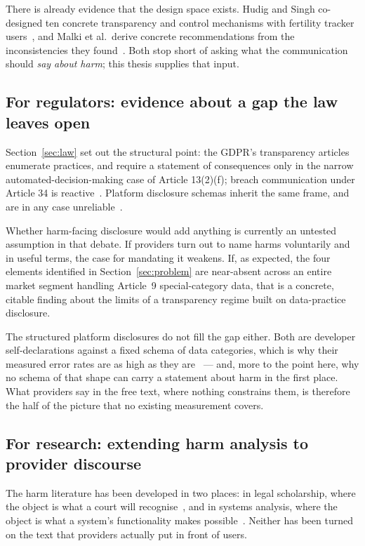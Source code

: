 There is already evidence that the design space exists. Hudig and Singh
co-designed ten concrete transparency and control mechanisms with fertility
tracker users~\parencite{hudig2025intimate}, and Malki et al.\ derive concrete
recommendations from the inconsistencies they
found~\parencite{malki2024exploring}. Both stop short of asking what the
communication should \emph{say about harm}; this thesis supplies that input.

\subsection{For regulators: evidence about a gap the law leaves open}

Section~\ref{sec:law} set out the structural point: the GDPR's
transparency articles enumerate practices, and require a statement of
consequences only in the narrow automated-decision-making case of Article
13(2)(f); breach communication under Article 34 is
reactive~\parencite{gdpr2016}. Platform disclosure schemas inherit the same
frame, and are in any case unreliable~\parencite{arkalakis2024abandon,li2022ios}.

Whether harm-facing disclosure would add anything is currently an untested
assumption in that debate. If providers turn out to name harms voluntarily and
in useful terms, the case for mandating it weakens. If, as expected, the four
elements identified in Section~\ref{sec:problem} are near-absent across an
entire market segment handling Article~9 special-category data, that is a
concrete, citable finding about the limits of a transparency regime built on
data-practice disclosure.

The structured platform disclosures do not fill the gap either. Both are
developer self-declarations against a fixed schema of data categories, which is
why their measured error rates are as high as they
are~\parencite{arkalakis2024abandon,li2022ios} --- and, more to the point here,
why no schema of that shape can carry a statement about harm in the first place.
What providers say in the free text, where nothing constrains them, is therefore
the half of the picture that no existing measurement covers.

\subsection{For research: extending harm analysis to provider discourse}

The harm literature has been developed in two places: in legal scholarship,
where the object is what a court will
recognise~\parencite{citron2021harms,calo2011boundaries,solove2006taxonomy}, and
in systems analysis, where the object is what a system's functionality makes
possible~\parencite{knabenhans2026harms}. Neither has been turned on the text
that providers actually put in front of users.

